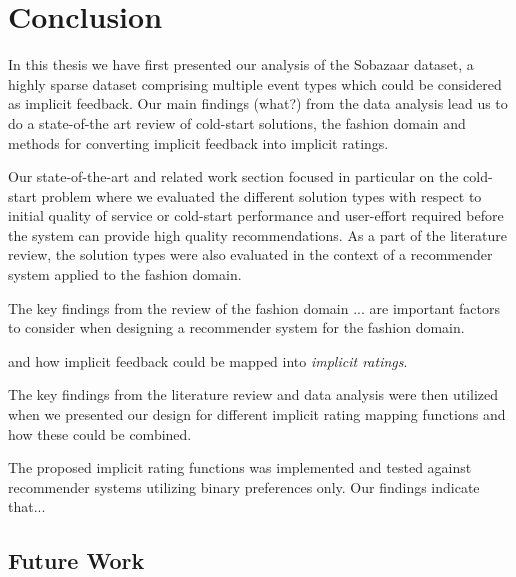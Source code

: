 
\chapter{Conclusion}
\label{chap:conclusion}
\minitoc

In this thesis we have first presented our analysis of the Sobazaar dataset, a highly sparse dataset comprising
multiple event types which could be considered as implicit feedback. Our main findings (what?) from the data analysis
lead us to do a state-of-the art review of cold-start solutions, the fashion domain and methods for converting
implicit feedback into implicit ratings.

Our state-of-the-art and related work section focused in particular on the cold-start problem where we evaluated the
different solution types with respect to initial quality of service or cold-start performance and user-effort required before the system can provide high quality recommendations.
As a part of the literature review, the solution types were also evaluated in the context of a recommender
system applied to the fashion domain.




The key findings from the review of the fashion domain ... are important factors to consider when designing a
recommender system for the fashion domain.


and how implicit feedback could be mapped into \emph{implicit ratings}.

The key findings from the literature review and data analysis were then utilized when we presented our
design for different implicit rating mapping functions and how these could be combined.


The proposed implicit rating functions was implemented and tested against recommender systems utilizing binary
preferences only. Our findings indicate that...







\clearpage




\section{Future Work}




